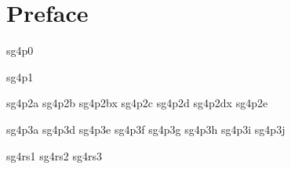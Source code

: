 \documentclass[chapters,twoside,11pt]{starlink}
\begin{document}
\scfrontmatter

\part{Preface}
 {sg4p0}

 {sg4p1}

 {sg4p2a}
 {sg4p2b}
 {sg4p2bx}
 {sg4p2c}
 {sg4p2d}
 {sg4p2dx}
 {sg4p2e}

 {sg4p3a}
 {sg4p3d}
 {sg4p3e}
 {sg4p3f}
 {sg4p3g}
 {sg4p3h}
 {sg4p3i}
 {sg4p3j}

 {sg4rs1}
 {sg4rs2}
 {sg4rs3}
\end{document}
